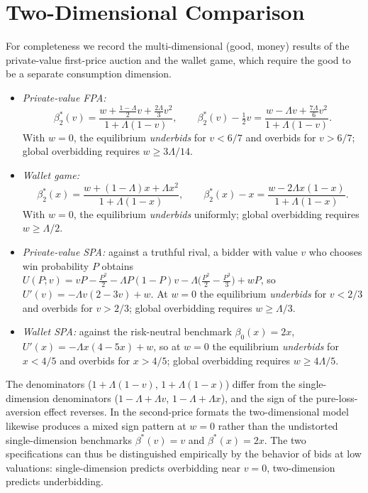 \documentclass[11pt,a4paper]{article}
\theoremstyle{remark}
\begin{document}
\section{Two-Dimensional Comparison}
\label{app:two}
For completeness we record the multi-dimensional (good, money) results of the
private-value first-price auction and the wallet game, which require the good to be
a separate consumption dimension.
\begin{itemize}
\item \emph{Private-value FPA:}
\begin{equation}
\beta^{*}_{2}(v)=\frac{w+\tfrac{1-\Lambda}{2}v+\tfrac{2\Lambda}{3}v^{2}}{1+\Lambda(1-v)},
\qquad
\beta^{*}_{2}(v)-\tfrac12 v=\frac{w-\Lambda v+\tfrac{7\Lambda}{6}v^{2}}{1+\Lambda(1-v)} .
\end{equation}
With $w=0$, the equilibrium \emph{underbids} for $v<6/7$ and overbids for $v>6/7$;
global overbidding requires $w\ge3\Lambda/14$.
\item \emph{Wallet game:}
\begin{equation}
\beta^{*}_{2}(x)=\frac{w+(1-\Lambda)x+\Lambda x^{2}}{1+\Lambda(1-x)},
\qquad
\beta^{*}_{2}(x)-x=\frac{w-2\Lambda x(1-x)}{1+\Lambda(1-x)} .
\end{equation}
With $w=0$, the equilibrium \emph{underbids} uniformly; global overbidding requires
$w\ge\Lambda/2$.
\item \emph{Private-value SPA:} against a truthful rival, a bidder with value $v$ who
chooses win probability $P$ obtains
$U(P;v)=vP-\tfrac{P^{2}}{2}-\Lambda P(1-P)v-\Lambda\big(\tfrac{P^{2}}{2}-\tfrac{P^{3}}{3}\big)+wP$,
so $U'(v)=-\Lambda v(2-3v)+w$. At $w=0$ the equilibrium \emph{underbids} for $v<2/3$
and overbids for $v>2/3$; global overbidding requires $w\ge\Lambda/3$.
\item \emph{Wallet SPA:} against the risk-neutral benchmark $\beta_0(x)=2x$,
$U'(x)=-\Lambda x(4-5x)+w$, so at $w=0$ the equilibrium \emph{underbids} for $x<4/5$
and overbids for $x>4/5$; global overbidding requires $w\ge4\Lambda/5$.
\end{itemize}
The denominators ($1+\Lambda(1-v)$, $1+\Lambda(1-x)$) differ from the single-dimension
denominators ($1-\Lambda+\Lambda v$, $1-\Lambda+\Lambda x$), and the sign of the
pure-loss-aversion effect reverses. In the second-price formats the two-dimensional
model likewise produces a mixed sign pattern at $w=0$ rather than the undistorted
single-dimension benchmarks $\beta^{*}(v)=v$ and $\beta^{*}(x)=2x$. The two
specifications can thus be distinguished empirically by the behavior of bids at low
valuations: single-dimension predicts overbidding near $v=0$, two-dimension predicts
underbidding.
\end{document}
